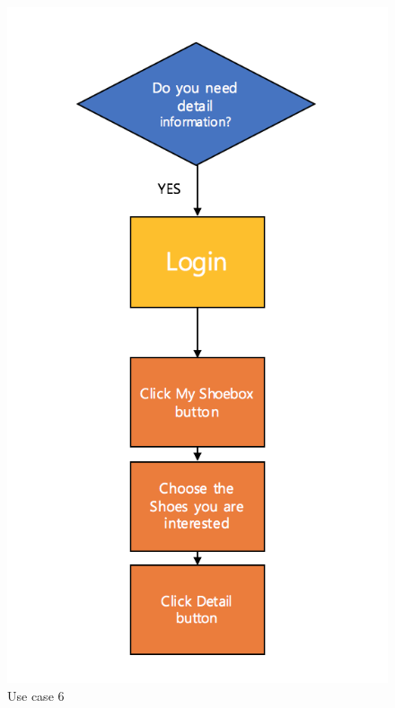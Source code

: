\documentclass[conference]{IEEEtran}
\begin{document}
\begin{figure}[h]
\begin{center}
    \includegraphics[scale=0.6]{usecase5}
    \caption{Use case 6} \label{fig:label}
\end{center}
\end{figure}

\end{document}
